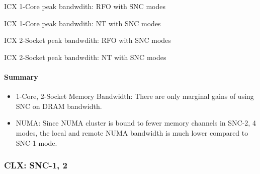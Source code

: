 \documentclass{article}
\begin{document}
\begin{table}[!hb]
\centering

\caption{ICX 1-Core peak bandwdith: RFO with SNC modes}
\label{table:mem_bw_core_rfo_icx_snc}
\end{table}
\begin{table}[!hb]
\centering

\caption{ICX 1-Core peak bandwdith: NT with SNC modes}
\label{table:mem_bw_core_nt_icx_snc}
\end{table}
\begin{table}[!hb]
\centering

\caption{ICX 2-Socket peak bandwdith: RFO with SNC modes}
\label{table:mem_bw_node_rfo_icx_snc}
\end{table}
\begin{table}[!hb]
\centering

\caption{ICX 2-Socket peak bandwdith: NT with SNC modes}
\label{table:mem_bw_node_nt_icx_snc}
\end{table}



\paragraph{Summary}
\begin{itemize}
\item 1-Core, 2-Socket Memory Bandwidth: There are only marginal gains of using SNC on DRAM bandwidth.
\item NUMA: Since NUMA cluster is bound to fewer memory channels in SNC-2, 4 modes, the local and remote NUMA bandwidth is much lower compared to SNC-1 mode.
\end{itemize}
\clearpage
\subsubsection{CLX: SNC-1, 2}
\end{document}
